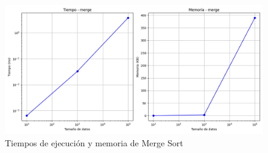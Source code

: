 \begin{figure}[H]
    \centering
    \includegraphics[width=\textwidth]{../code/sorting/data/plots/scaling_merge.png}
    \caption{Tiempos de ejecución y memoria de Merge Sort}
    \label{fig:scaling_merge}
\end{figure}

